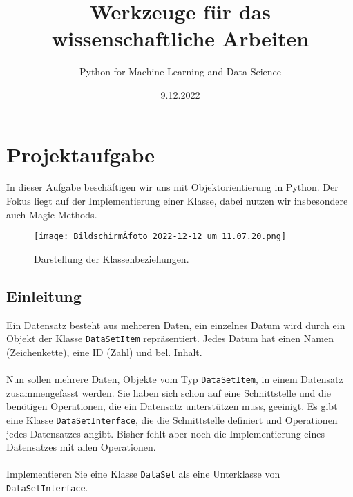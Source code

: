 \documentclass[
    12pt, %
    a4paper, %
    parskip=full, %
    ]{scrartcl}
\begin{document}
    \title{Werkzeuge für das wissenschaftliche Arbeiten}
    \author{ Python for Machine Learning and Data Science}
    \date{9.12.2022}
    \maketitle

    \tableofcontents

    \newpage

    \section{Projektaufgabe}
    In dieser Aufgabe beschäftigen wir uns mit Objektorientierung in Python.
    Der Fokus liegt auf der Implementierung einer Klasse, dabei nutzen wir insbesondere auch Magic Methods.\\

    \begin{figure} [h]
    \centering
        \texttt{[image: BildschirmÂ­foto 2022-12-12 um 11.07.20.png]}
        \caption{Darstellung der Klassenbeziehungen.}
    \end{figure}
    
    

        \subsection{Einleitung}
        Ein Datensatz besteht aus mehreren Daten, ein einzelnes Datum wird durch ein Objekt der Klasse \texttt{DataSetItem} repräsentiert.
        Jedes Datum hat einen Namen (Zeichenkette), eine ID (Zahl) und bel. Inhalt.\\
        \\
        Nun sollen mehrere Daten, Objekte vom Typ \texttt{DataSetItem}, in einem Datensatz zusammengefasst werden.
        Sie haben sich schon auf eine Schnittstelle und die benötigen Operationen, die ein Datensatz unterstützen muss, geeinigt.
        Es gibt eine Klasse \texttt{DataSetInterface}, die die Schnittstelle definiert und Operationen jedes Datensatzes angibt.
        Bisher fehlt aber noch die Implementierung eines Datensatzes mit allen Operationen.\\
        \\
        Implementieren Sie eine Klasse \texttt{DataSet} als eine Unterklasse von \texttt{DataSetInterface}.\\
        \\
        
\end{document}
